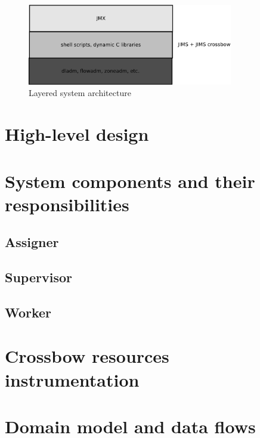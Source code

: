\documentclass[11pt]{book}
\begin{document}

        \begin{figure}[H]
          \begin{center}
            \includegraphics[width=0.8\textwidth]{img/architecture/layered_architecture.pdf}
          \end{center}
          \caption{Layered system architecture}
        \end{figure}  


    \section{High-level design}


    \section{System components and their responsibilities}

      \subsection{Assigner}

      \subsection{Supervisor}

      \subsection{Worker}


    \section{Crossbow resources instrumentation}


    \section{Domain model and data flows} \label{sec:domain-model}
\end{document}
